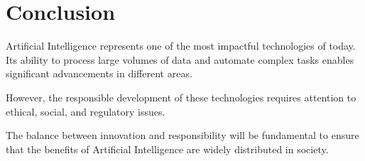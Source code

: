 \section{Conclusion}

Artificial Intelligence represents one of the most impactful technologies of today. Its ability to process large volumes of data and automate complex tasks enables significant advancements in different areas.

However, the responsible development of these technologies requires attention to ethical, social, and regulatory issues.

The balance between innovation and responsibility will be fundamental to ensure that the benefits of Artificial Intelligence are widely distributed in society.  